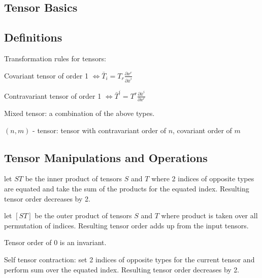 \documentclass[8pt,letter]{article}
\begin{document}


\begin{multicols*}{2}

  \section{Tensor Basics}

  \subsection{Definitions}

  Transformation rules for tensors:
  
  Covariant tensor of order 1 $\iff \bar{T}_i = T_r \frac{\partial x^r}{\partial \bar{x}^i}$

  Contravariant tensor of order 1 $\iff \bar{T}^i = T^r \frac{\partial \bar{x}^i}{\partial x^r}$

  Mixed tensor: a combination of the above types.

  $(n,m)$ - tensor: tensor with contravariant order of $n$, covariant order of $m$
  
  \subsection{Tensor Manipulations and Operations}

  let $ST$ be the inner product of tensors $S$ and $T$ where 2 indices of opposite types are equated and take the sum of the products for the equated index. Resulting tensor order decreases by 2.

  let $[ST]$ be the outer product of tensors $S$ and $T$ where product is taken over all permutation of indices. Resulting tensor order adds up from the input tensors.

  Tensor order of 0 is an invariant.

  Self tensor contraction: set 2 indices of opposite types for the current tensor and perform sum over the equated index. Resulting tensor order decreases by 2.


\end{multicols*}
\end{document}
